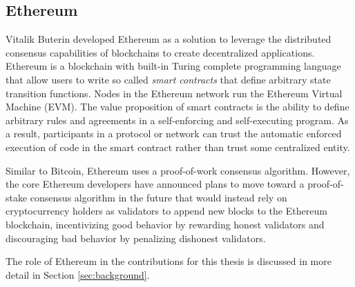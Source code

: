 \subsection{Ethereum}

Vitalik Buterin developed Ethereum as a solution to leverage the distributed
consensus capabilities of blockchains to create decentralized
applications. Ethereum is a blockchain with built-in Turing
complete programming language that allow users to write so called \textit{smart
  contracts} that define arbitrary state transition functions\cite{ethereum}.
Nodes in the Ethereum network run the Ethereum Virtual Machine (EVM). The value
proposition of smart contracts is the ability to define arbitrary rules and
agreements in a self-enforcing and self-executing program. As a result,
participants in a protocol or network can trust the automatic enforced execution
of code in the smart contract rather than trust some centralized entity.

Similar to Bitcoin, Ethereum uses a proof-of-work consensus algorithm. However,
the core Ethereum developers have announced plans to move toward a
proof-of-stake consensus algorithm in the future that would instead rely on
cryptocurrency holders as validators to append new blocks to the Ethereum blockchain,
incentivizing good behavior by rewarding honest validators and discouraging bad
behavior by penalizing dishonest validators\cite{casper}.

The role of Ethereum in the contributions for this thesis is discussed in more
detail in Section \ref{sec:background}.

